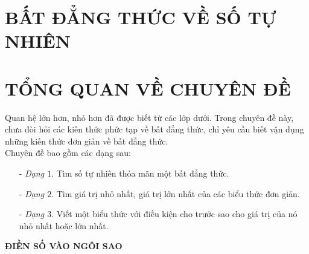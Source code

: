 

\section{BẤT ĐẲNG THỨC VỀ SỐ TỰ NHIÊN}
\section*{TỔNG QUAN VỀ CHUYÊN ĐỀ}

\indent Quan hệ lớn hơn, nhỏ hơn đã được biết từ các lớp dưới. Trong chuyên đề này, chưa đòi hỏi các kiến thức phức tạp về  bất đẳng thức, chỉ yêu cầu biết vận dụng những kiến thức đơn giản về bất đẳng thức.\\
\indent  Chuyên đề bao gồm các dạng sau:
\begin{itemize}
\item[-] {\it Dạng $1$}. Tìm số tự nhiên thỏa mãn một bất đẳng thức.
\item[-] {\it Dạng $2$}. Tìm giá trị nhỏ nhất, giá trị lớn nhất của các biểu thức đơn giản.
\item[-] {\it Dạng $3$}. Viết một biểu thức với điều kiện cho trước sao cho giá trị của nó nhỏ nhất hoặc lớn nhất.
\end{itemize}

\centerline{\bf \large ĐIỀN SỐ VÀO NGÔI SAO}
\vspace{13pt}

